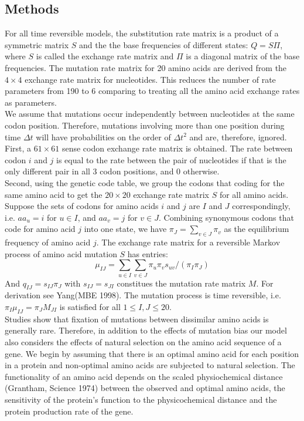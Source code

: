 \documentclass[13pt]{article}
\begin{document}
\subsection{Methods}
For all time reversible models, the substitution rate matrix is a product of a symmetric matrix $S$ and the the base frequencies of different states: $Q = S\Pi$, where $S$ is called the exchange rate matrix and $\Pi$ is a diagonal matrix of the base frequencies. The mutation rate matrix for 20 amino acids are derived from the $4 \times 4 $ exchange rate matrix for nucleotides. This reduces the number of rate parameters from 190 to 6 comparing to treating all the amino acid exchange rates as parameters.\\

We assume that mutations occur independently between nucleotides at the same codon position. Therefore, mutations involving more than one position during time $\Delta t$ will have probabilities on the order of $\Delta t^2$ and are, therefore, ignored. First, a $61 \times 61$ sense codon exchange rate matrix is obtained. The rate between codon $i$ and $j$ is equal to the rate between the pair of nucleotides if that is the only different pair in all 3 codon positions, and 0 otherwise.\\


Second, using the genetic code table, we group the codons that coding for the same amino acid to get the $20 \times 20$ exchange rate matrix $S$ for all amino acids. Suppose the sets of codons for amino acids $i$ and $j$ are $I$ and $J$ correspondingly, i.e. $aa_u = i$ for $u \in I$, and $aa_v = j$ for $v \in J$. Combining synonymous codons that code for amino acid $j$ into one state, we have $\pi_J = \sum_{v \in J} \pi_v$ as the equilibrium frequency of amino acid $j$. The exchange rate matrix for a reversible Markov process of amino acid mutation $S$ has entries:
\[\mu_{IJ} = \sum_{u \in I} \sum_{v \in J} \pi_u \pi_v s_{uv} / (\pi_I \pi_J)\]
\noindent
And $q_{IJ} = s_{IJ} \pi_J$ with $s_{IJ}  = s_{JI}$ constitues the mutation rate matrix $M$. For derivation see Yang(MBE 1998). The mutation process is time reversible, i.e. $\pi_I \mu_{IJ} = \pi_J M_{JI}$ is satisfied for all $1 \le I,J \le 20$.\\

Studies show that fixation of mutations between dissimilar amino acids is generally rare. Therefore, in addition to the effects of mutation bias our model also considers the effects of natural selection on the amino acid sequence of a gene. We begin by assuming that there is an optimal amino acid for each position in a protein and non-optimal amino acids are subjected to natural selection. The functionality of an amino acid depends on the scaled physiochemical distance (Grantham, Science 1974) between the observed and optimal amino acids, the sensitivity of the protein's function to the physicochemical distance and the protein production rate of the gene. \\
\end{document}
